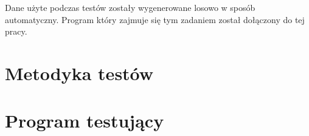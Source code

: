 \documentclass[12pt,a4paper,oneside]{report}
\begin{document}
Dane użyte podczas testów zostały wygenerowane losowo w sposób automatyczny. Program który zajmuje się tym zadaniem został dołączony do tej pracy.





\appendix

\chapter{Metodyka testów}



\chapter{Program testujący}






\clearpage
{}
{}
\printindex
\end{document}
